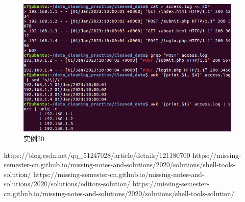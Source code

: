 \documentclass[cn,12pt]{report}
\begin{document}
      \begin{figure}[htbp]
    \centering
    \includegraphics[width=1\textwidth]{image/20.png}
    \caption{实例20}
  \end{figure}

\newpage

\begin{thebibliography}{99}
 https://blog.csdn.net/qq\_51247028/article/details/121180700
 https://missing-semester-cn.github.io/missing-notes-and-solutions/2020/solutions/shell-tools-solution/
 https://missing-semester-cn.github.io/missing-notes-and-solutions/2020/solutions/editors-solution/
 https://missing-semester-cn.github.io/missing-notes-and-solutions/2020/solutions/shell-tools-solution/

\end{thebibliography}
\end{document}
